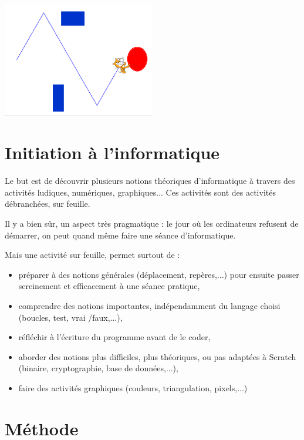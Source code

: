\documentclass[class=report,crop=false, 12pt]{standalone}
\begin{document}
\begin{center}
  \includegraphics[width=0.5\textwidth]{../fiche04/ecran-04-ex1} 
\end{center}

\section{Initiation à l'informatique}

Le but est de découvrir plusieurs notions théoriques d'informatique à travers des activités ludiques, numériques, graphiques...
Ces activités sont des activités débranchées, sur feuille. 

Il y a bien sûr, un aspect très pragmatique : le jour où les ordinateurs refusent de démarrer, on peut quand même faire une séance d'informatique.

Mais une activité sur feuille, permet surtout de :
\begin{itemize}
  \item préparer à des notions générales (déplacement, repères,...) pour ensuite passer sereinement et efficacement à une séance pratique, 
  
  \item comprendre des notions importantes, indépendamment du langage choisi (boucles, test, vrai \slash faux,...),
  
  \item réfléchir à l'écriture du programme avant de le coder,
  
  \item aborder des notions plus difficiles, plus théoriques, ou pas adaptées à Scratch (binaire, cryptographie, base de données,...),
  
  \item faire des activités graphiques (couleurs, triangulation, pixels,...)
\end{itemize}


\section{Méthode}
\end{document}
